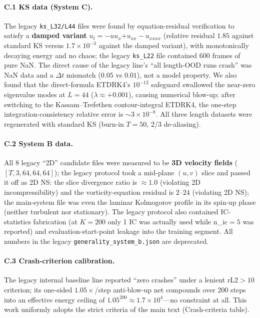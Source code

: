 \documentclass[11pt,a4paper]{article}
\begin{document}
\paragraph{C.1 KS data (System C).} The legacy \texttt{ks\_L32/L44} files were found by equation-residual verification to satisfy a \textbf{damped variant} $u_t=-uu_x\boldsymbol{+}u_{xx}-u_{xxxx}$ (relative residual $1.85$ against standard KS versus $1.7\times10^{-3}$ against the damped variant), with monotonically decaying energy and no chaos; the legacy \texttt{ks\_L22} file contained 600 frames of pure NaN. The direct cause of the legacy line's ``all length-OOD runs crash'' was NaN data and a $\Delta t$ mismatch ($0.05$ vs $0.01$), not a model property. We also found that the direct-formula ETDRK4's $10^{-12}$ safeguard swallowed the near-zero eigenvalue modes at $L{=}44$ ($\lambda\approx+0.001$), causing numerical blow-up; after switching to the Kassam--Trefethen contour-integral ETDRK4, the one-step integration-consistency relative error is $\sim3\times10^{-8}$. All three length datasets were regenerated with standard KS (burn-in $T{=}50$, 2/3 de-aliasing).

\paragraph{C.2 System B data.} All 8 legacy ``2D'' candidate files were measured to be \textbf{3D velocity fields} ($[T,3,64,64,64]$); the legacy protocol took a mid-plane $(u,v)$ slice and passed it off as 2D NS: the slice divergence ratio is $\approx1.0$ (violating 2D incompressibility) and the vorticity-equation residual is $2$--$24$ (violating 2D NS); the main-system file was even the laminar Kolmogorov profile in its spin-up phase (neither turbulent nor stationary). The legacy protocol also contained IC-statistics fabrication (at $K{=}200$ only 1 IC was actually used while n\_ic$=5$ was reported) and evaluation-start-point leakage into the training segment. All numbers in the legacy \texttt{generality\_system\_b.json} are deprecated.

\paragraph{C.3 Crash-criterion calibration.} The legacy internal baseline line reported ``zero crashes'' under a lenient rL2${}>10$ criterion; its one-sided $1.05\times$/step anti-blow-up net compounds over 200 steps into an effective energy ceiling of $1.05^{200}\approx1.7\times10^{4}$---no constraint at all. This work uniformly adopts the strict criteria of the main text (Crash-criteria table).
\end{document}
